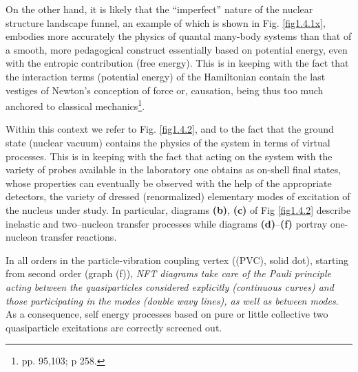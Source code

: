 On the other hand, it is likely that the ``imperfect'' nature of the nuclear structure landscape funnel, an example of which is shown in Fig. \ref{fig1.4.1x}, embodies more accurately the physics of quantal many-body systems than that of a smooth, more pedagogical construct essentially based on potential energy, even with the entropic contribution (free energy). This is in keeping with the fact that the interaction terms (potential energy) of the Hamiltonian contain the last vestiges of Newton's conception of force or, causation, being thus too much anchored to classical mechanics\footnote{\cite{Born:48} pp. 95,103; \cite{Pais:86} p 258.}.

Within this context we refer to Fig. \ref{fig1.4.2}, and to the fact that the ground state (nuclear vacuum)  contains the physics of the system in terms of virtual processes. This is in keeping with  the fact that acting on  the system with the variety of probes available in the laboratory one obtains as on-shell final states, whose properties can eventually be observed with the help of the appropriate detectors, the variety of dressed (renormalized) elementary modes of excitation of the nucleus under study. In particular, diagrams \textbf{(b)}, \textbf{(c)} of Fig \ref{fig1.4.2} describe inelastic and two--nucleon transfer processes while diagrams  \textbf{(d)}--\textbf{(f)} portray  one-nucleon transfer reactions. 


In all orders in the particle-vibration coupling vertex ((PVC), solid dot), starting from second order (graph (f)), \textit{NFT diagrams take care of the  Pauli principle acting between the quasiparticles considered explicitly (continuous curves) and those participating in the modes (double wavy lines), as well as between modes}. As a consequence, self energy processes based on pure or  little collective two quasiparticle excitations are correctly screened out.



